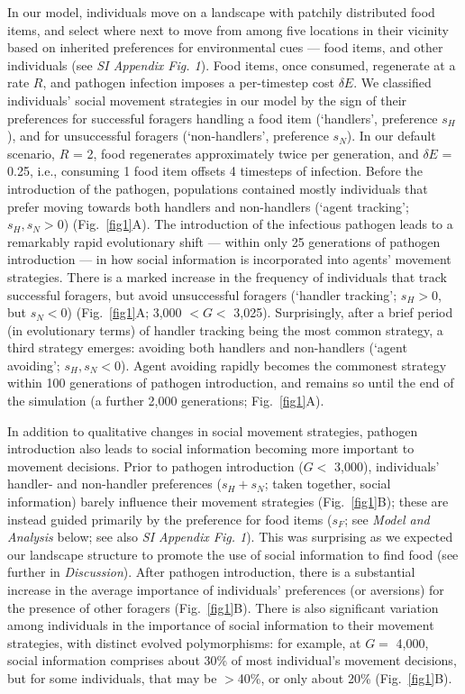 In our model, individuals move on a landscape with patchily distributed food items, and select where next to move from among five locations in their vicinity based on inherited preferences for environmental cues --- food items, and other individuals (see \textit{SI Appendix Fig. 1}).
Food items, once consumed, regenerate at a rate $R$, and pathogen infection imposes a per-timestep cost $\delta E$.
We classified individuals' social movement strategies in our model by the sign of their preferences for successful foragers handling a food item (`handlers', preference $s_H$), and for unsuccessful foragers (`non-handlers', preference $s_N$).
In our default scenario, $R$ = 2, food regenerates approximately twice per generation, and $\delta E$ = 0.25, i.e., consuming 1 food item offsets 4 timesteps of infection. 
Before the introduction of the pathogen, populations contained mostly individuals that prefer moving towards both handlers and non-handlers (`agent tracking'; $s_H, s_N > 0$) (Fig.~\ref{fig1}A).
The introduction of the infectious pathogen leads to a remarkably rapid evolutionary shift --- within only 25 generations of pathogen introduction --- in how social information is incorporated into agents' movement strategies.
There is a marked increase in the frequency of individuals that track successful foragers, but avoid unsuccessful foragers (`handler tracking'; $s_H > 0$, but $s_N < 0$) (Fig.~\ref{fig1}A; 3,000 $< G <$ 3,025).
Surprisingly, after a brief period (in evolutionary terms) of handler tracking being the most common strategy, a third strategy emerges: avoiding both handlers and non-handlers (`agent avoiding'; $s_H, s_N < 0$).
Agent avoiding rapidly becomes the commonest strategy within 100 generations of pathogen introduction, and remains so until the end of the simulation (a further 2,000 generations; Fig.~\ref{fig1}A).

In addition to qualitative changes in social movement strategies, pathogen introduction also leads to social information becoming more important to movement decisions.
Prior to pathogen introduction ($G <$ 3,000), individuals' handler- and non-handler preferences ($s_H + s_N$; taken together, social information) barely influence their movement strategies (Fig.~\ref{fig1}B); these are instead guided primarily by the preference for food items ($s_F$; see \textit{Model and Analysis} below; see also \textit{SI Appendix Fig. 1}).
This was surprising as we expected our landscape structure to promote the use of social information to find food (see further in \textit{Discussion}).
After pathogen introduction, there is a substantial increase in the average importance of individuals' preferences (or aversions) for the presence of other foragers (Fig.~\ref{fig1}B).
There is also significant variation among individuals in the importance of social information to their movement strategies, with distinct evolved polymorphisms: for example, at $G =$ 4,000, social information comprises about 30\% of most individual's movement decisions, but for some individuals, that may be $>$40\%, or only about 20\% (Fig.~\ref{fig1}B).

